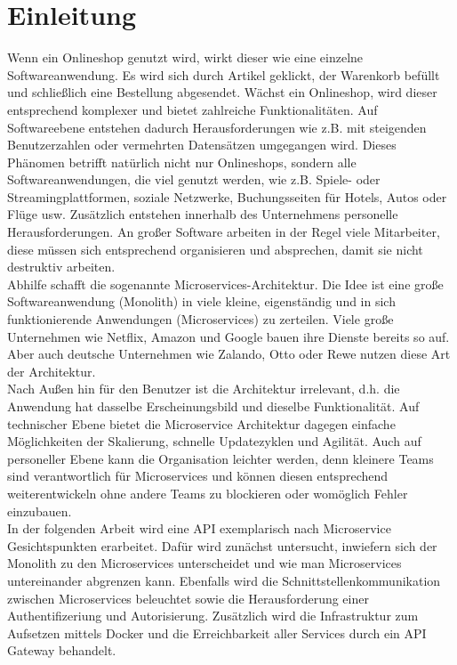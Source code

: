 \section{Einleitung}\label{sec:einleitung}

Wenn ein Onlineshop genutzt wird, wirkt dieser wie eine einzelne Softwareanwendung. Es wird sich durch Artikel geklickt, der Warenkorb befüllt und schließlich eine Bestellung abgesendet. Wächst ein Onlineshop, wird dieser entsprechend komplexer und bietet zahlreiche Funktionalitäten. Auf Softwareebene entstehen dadurch Herausforderungen wie z.B. mit steigenden Benutzerzahlen oder vermehrten Datensätzen umgegangen wird. Dieses Phänomen betrifft natürlich nicht nur Onlineshops, sondern alle Softwareanwendungen, die viel genutzt werden, wie z.B. Spiele- oder Streamingplattformen, soziale Netzwerke, Buchungsseiten für Hotels, Autos oder Flüge usw. Zusätzlich entstehen innerhalb des Unternehmens personelle Herausforderungen. An großer Software arbeiten in der Regel viele Mitarbeiter, diese müssen sich entsprechend organisieren und absprechen, damit sie nicht destruktiv arbeiten.\\

Abhilfe schafft die sogenannte Microservices-Architektur. Die Idee ist eine große Softwareanwendung (Monolith) in viele kleine, eigenständig und in sich funktionierende Anwendungen (Microservices) zu zerteilen. Viele große Unternehmen wie Netflix, Amazon und Google bauen ihre Dienste bereits so auf. Aber auch deutsche Unternehmen wie Zalando, Otto oder Rewe nutzen diese Art der Architektur.\\

Nach Außen hin für den Benutzer ist die Architektur irrelevant, d.h. die Anwendung hat dasselbe Erscheinungsbild und dieselbe Funktionalität. Auf technischer Ebene bietet die Microservice Architektur dagegen einfache Möglichkeiten der Skalierung, schnelle Updatezyklen und Agilität. Auch auf personeller Ebene kann die Organisation leichter werden, denn kleinere Teams sind verantwortlich für Microservices und können diesen entsprechend weiterentwickeln ohne andere Teams zu blockieren oder womöglich Fehler einzubauen. \\

In der folgenden Arbeit wird eine API exemplarisch nach Microservice Gesichtspunkten erarbeitet. Dafür wird zunächst untersucht, inwiefern sich der Monolith zu den Microservices unterscheidet und wie man Microservices untereinander abgrenzen kann. Ebenfalls wird die Schnittstellenkommunikation zwischen Microservices beleuchtet sowie die Herausforderung einer Authentifizeriung und Autorisierung. Zusätzlich wird die Infrastruktur zum Aufsetzen mittels Docker und die Erreichbarkeit aller Services durch ein API Gateway behandelt.\\ 


